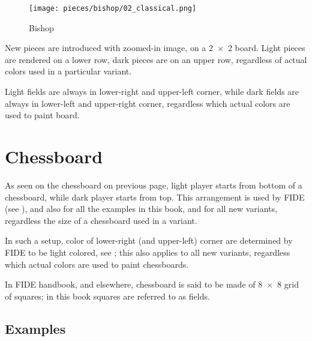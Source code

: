 \noindent
\begin{wrapfigure}[12]{l}{0.4\textwidth}
\centering
\texttt{[image: pieces/bishop/02\_classical.png]}
\caption{Bishop}
\label{fig:bishop/02_classical}
\end{wrapfigure}
New pieces are introduced with zoomed-in image, on a \mbox{2 $\times$ 2} board.
Light pieces are rendered on a lower row, dark pieces are on an upper row,
regardless of actual colors used in a particular variant. %

Light fields are always in lower-right and upper-left corner, while dark fields
are always in lower-left and upper-right corner, regardless which actual colors
are used to paint board.


\section*{Chessboard}
\label{sec:Classical Chess/Chessboard}

As seen on the chessboard on previous page, light player starts from bottom of
a chessboard, while dark player starts from top. This arrangement is used by FIDE
(see ), and also for all the examples in this book, and for all
new variants, regardless the size of a chessboard used in a variant.

In such a setup, color of lower-right (and upper-left) corner are determined by
FIDE to be light colored, see ; this also applies to all new
variants, regardless which actual colors are used to paint chessboards.

In FIDE handbook, and elsewhere, chessboard is said to be made of \mbox{8 $\times$ 8}
grid of squares; in this book squares are referred to as fields.

\clearpage %

\subsection*{Examples}
\label{sec:Classical Chess/Chessboard/Examples}

